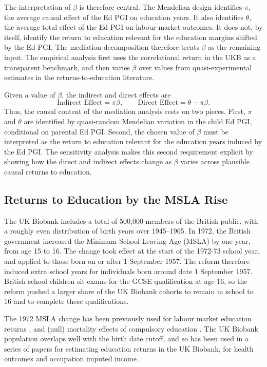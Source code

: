 The interpretation of $\beta$ is therefore central.
The Mendelian design identifies $\pi$, the average causal effect of the Ed PGI on education years.
It also identifies $\theta$, the average total effect of the Ed PGI on labour-market outcomes.
It does not, by itself, identify the return to education relevant for the education margins shifted by the Ed PGI.
The mediation decomposition therefore treats $\beta$ as the remaining input.
The empirical analysis first uses the correlational return in the UKB as a transparent benchmark, and then varies $\beta$ over values from quasi-experimental estimates in the returns-to-education literature.

Given a value of $\beta$, the indirect and direct effects are
\[
    \text{Indirect Effect}
    =
    \pi\beta,
    \qquad
    \text{Direct Effect}
    =
    \theta - \pi\beta.
\]
Thus, the causal content of the mediation analysis rests on two pieces.
First, $\pi$ and $\theta$ are identified by quasi-random Mendelian variation in the child Ed PGI, conditional on parental Ed PGI.
Second, the chosen value of $\beta$ must be interpreted as the return to education relevant for the education years induced by the Ed PGI.
The sensitivity analysis makes this second requirement explicit by showing how the direct and indirect effects change as $\beta$ varies across plausible causal returns to education.

\subsection{Returns to Education by the MSLA Rise}
\label{appendix:MSLA}
The UK Biobank includes a total of 500,000 members of the British public, with a roughly even distribution of birth years over 1945--1965.
In 1972, the British government increased the Minimum School Leaving Age (MSLA) by one year, from age 15 to 16.
The change took effect at the start of the 1972-73 school year, and applied to those born on or after 1 September 1957.
The reform therefore induced extra school years for individuals born around date 1 September 1957.
British school children sit exams for the GCSE qualification at age 16, so the reform pushed a larger share of the UK Biobank cohorts to remain in school to 16 and to complete these qualifications.

The 1972 MSLA change has been previously used for labour market education returns \citep{oreopoulos2006estimating}, and (null) mortality effects of compulsory education \citep{clark2013effect}.
The UK Biobank population overlaps well with the birth date cutoff, and so has been used in a series of papers for estimating education returns in the UK Biobank, for health outcomes \citep{barcellos2023distributional,barcellos2025education,davies2018causal} and occupation imputed income \citep{barcellos2021effect}.

